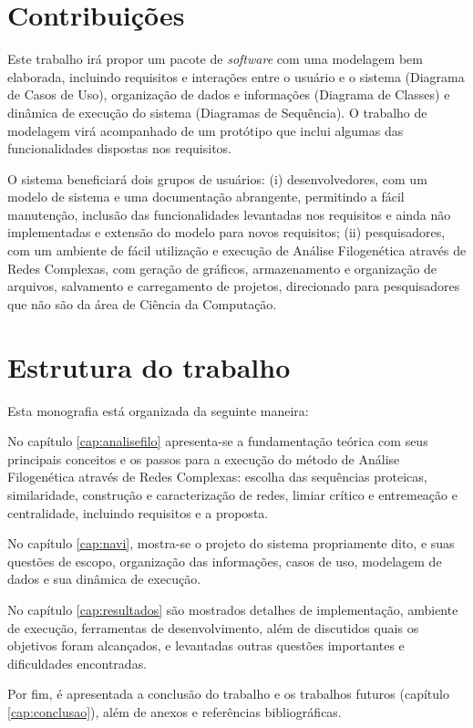 \section{Contribuições}

Este trabalho irá propor um pacote de \textit{software} com uma modelagem bem elaborada, incluindo requisitos e interações entre o usuário
e o sistema (Diagrama de Casos de Uso), organização de dados e informações (Diagrama de Classes) e dinâmica de execução do sistema (Diagramas de Sequência).
O trabalho de modelagem virá acompanhado de um protótipo que inclui algumas das funcionalidades dispostas nos requisitos.

O sistema beneficiará dois grupos de usuários: (i) desenvolvedores, com um modelo de sistema e uma documentação abrangente, permitindo a fácil
manutenção, inclusão das funcionalidades levantadas nos requisitos e ainda não implementadas e extensão do modelo para novos requisitos; (ii) pesquisadores,
com um ambiente de fácil utilização e execução de Análise Filogenética através de Redes Complexas, com geração de gráficos, armazenamento e organização de
arquivos, salvamento e carregamento de projetos, direcionado para pesquisadores que não são da área de Ciência da Computação.

\section{Estrutura do trabalho}

Esta monografia está organizada da seguinte maneira:

No capítulo \ref{cap:analisefilo} apresenta-se a fundamentação teórica com seus principais conceitos
e os passos para a execução do método de Análise Filogenética através de Redes Complexas: escolha das sequências proteicas,
similaridade, construção e caracterização de redes, limiar crítico e entremeação e centralidade, incluindo requisitos e a proposta.

No capítulo \ref{cap:navi}, mostra-se o projeto do sistema propriamente dito, e suas questões
de escopo, organização das informações, casos de uso, modelagem de dados e sua dinâmica de execução.

No capítulo \ref{cap:resultados} são mostrados detalhes de implementação, ambiente de execução, ferramentas de
desenvolvimento, além de discutidos quais os objetivos foram alcançados, e levantadas outras questões importantes e dificuldades encontradas.

Por fim, é apresentada a conclusão do trabalho e os trabalhos futuros (capítulo \ref{cap:conclusao}), além de anexos e referências bibliográficas.





